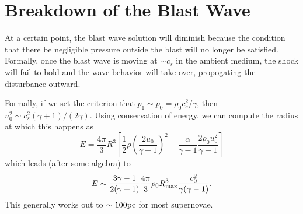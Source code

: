 \section{Breakdown of the Blast Wave}
At a certain point, the blast wave solution will diminish because the condition that there be negligible pressure outside the blast will no longer be satisfied. Formally, once the blast wave is moving at $\sim c_s$ in the ambient medium, the shock will fail to hold and the wave behavior will take over, propogating the disturbance outward.

Formally, if we set the criterion that $p_1 \sim p_0 = \rho_0 c_s^2/\gamma$, then $u_0^2 \sim c_s^2(\gamma +1)/(2\gamma).$ Using conservation of energy, we can compute the radius at which this happens as
\[
E = \frac{4\pi }{3} R^3 \left[\frac{1}{2}\rho \left(\frac{2u_0}{\gamma +1}\right)^2 + \frac{\alpha}{\gamma -1} \frac{2\rho_0 u_0^2}{\gamma +1}\right]
\]
which leads (after some algebra) to
\[
E \sim \frac{3\gamma - 1}{2(\gamma + 1)} \frac{4\pi}{3}\rho_0 R^3_{\rm max} \frac{c_0^2}{\gamma(\gamma -1)}.
\]
This generally works out to $\sim 100 {\rm pc}$ for most supernovae.